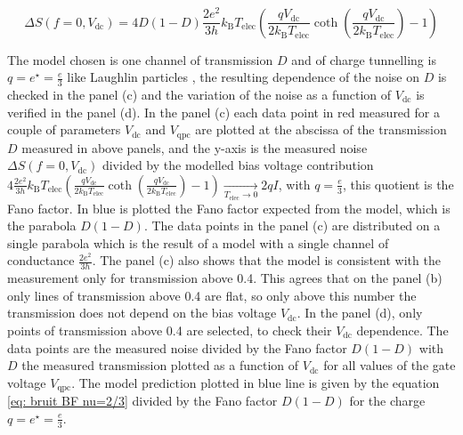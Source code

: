 \begin{equation}
\Delta S\left(f=0,V_{\mathrm{dc}}\right) = 4D\left(1-D\right)\frac{2e^{2}}{3h}k_{\mathrm{B}}T_{\mathrm{elec}}\left(\frac{qV_{\mathrm{dc}}}{2k_{\mathrm{B}}T_{\mathrm{elec}}}\coth\left(\frac{qV_{\mathrm{dc}}}{2k_{\mathrm{B}}T_{\mathrm{elec}}}\right)-1\right) \label{eq: bruit BF nu=2/3}
\end{equation}

The model chosen is one channel of transmission $D$ and of charge tunnelling is $q = e^{\star} = \frac{e}{3}$ like Laughlin particles \cite{laughlin1983anomalous}, the resulting dependence of the noise on $D$ is checked in the panel (c) and the variation of the noise as a function of $V_{\mathrm{dc}}$ is verified in the panel (d).
In the panel (c) each data point in red measured for a couple of parameters $V_{\mathrm{dc}}$ and $V_{\mathrm{qpc}}$ are plotted at the abscissa of the transmission $D$ measured in above panels, and the y-axis is the measured noise $\Delta S\left(f=0,V_{\mathrm{dc}}\right)$ divided by the modelled bias voltage contribution $4\frac{2e^{2}}{3h}k_{\mathrm{B}}T_{\mathrm{elec}}\left(\frac{qV_{\mathrm{dc}}}{2k_{\mathrm{B}}T_{\mathrm{elec}}}\coth\left(\frac{qV_{\mathrm{dc}}}{2k_{\mathrm{B}}T_{\mathrm{elec}}}\right)-1\right)\underset{T_{\mathrm{elec}}\to0}{\longrightarrow}2qI$, with $q = \frac{e}{3}$, this quotient is the Fano factor.
In blue is plotted the Fano factor expected from the model, which is the parabola $D\left(1-D\right)$.
The data points in the panel (c) are distributed on a single parabola which is the result of a model with a single channel of conductance $\frac{2e^{2}}{3h}$.
The panel (c) also shows that the model is consistent with the measurement only for transmission above 0.4.
This agrees that on the panel (b) only lines of transmission above 0.4 are flat, so only above this number the transmission does not depend on the bias voltage $V_{\mathrm{dc}}$.
In the panel (d), only points of transmission above 0.4 are selected, to check their $V_{\mathrm{dc}}$ dependence.
The data points are the measured noise divided by the Fano factor $D\left(1-D\right)$ with $D$ the measured transmission plotted as a function of $V_{\mathrm{dc}}$ for all values of the gate voltage $V_{\mathrm{qpc}}$.
The model prediction plotted in blue line is given by the equation \eqref{eq: bruit BF nu=2/3} divided by the Fano factor $D\left(1-D\right)$ for the charge $q = e^{\star} = \frac{e}{3}$.
